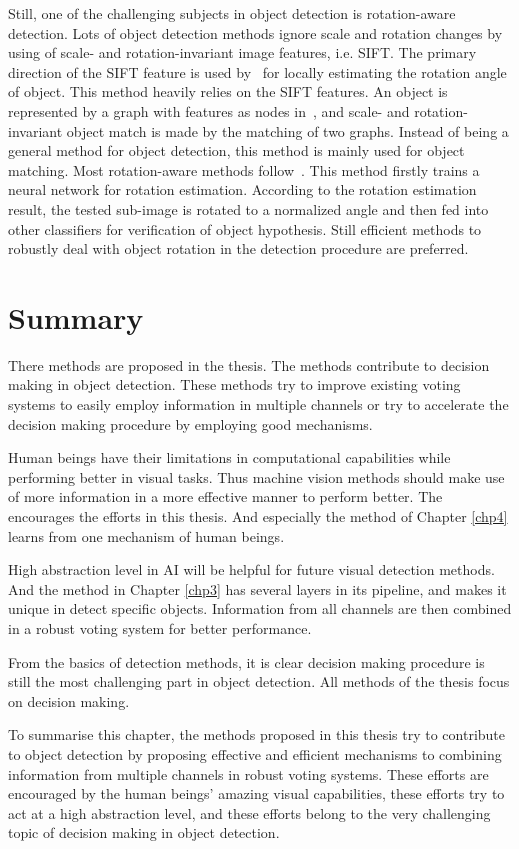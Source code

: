 Still, one of the challenging subjects in object detection is rotation-aware detection. Lots of object detection methods ignore scale and rotation changes by using of scale- and rotation-invariant image features, i.e. SIFT.
The primary  direction of the SIFT feature is used by~\citep{ac21} for locally estimating the rotation angle of object. This method heavily relies on the SIFT features.
An object is represented by a graph with features as nodes in~\citep{ac222}, and scale- and rotation-invariant object match is made by the matching of two graphs. Instead of being a general method for object detection, this method is mainly used for object matching.
Most rotation-aware methods follow~\citep{ac20}. This method firstly trains a neural network for rotation estimation. According to the rotation estimation result, the tested sub-image is rotated to a normalized angle and then fed into other classifiers for verification of object hypothesis. Still efficient methods to robustly deal with object rotation in the detection procedure are preferred.




\begin{comment}
(a) a well-de?ned closed boundary
in space; (b) a different appearance from their surroundings [23, 25]; (c) sometimes it is unique within the image
and stands out as salient
\end{comment}
\section{Summary}
\label{ch2p5}
There methods are proposed in the thesis. The methods contribute to decision making in object detection. These methods try to improve existing voting systems to easily employ information in multiple channels or try to accelerate the decision making procedure by employing good mechanisms. 

Human beings have their limitations in computational capabilities while performing better in visual tasks. Thus machine vision methods should make use of more information in a more effective manner to perform better. The encourages the efforts in this thesis. And especially the method of Chapter \ref{chp4} learns from one mechanism of human beings.

High abstraction level in AI will be helpful for future visual detection methods. And the method in Chapter \ref{chp3} has several layers in its pipeline, and makes it unique in detect specific objects. Information from all channels are then combined in a robust voting system for better performance. 

From the basics of detection methods, it is clear decision making procedure is still the most challenging part in object detection. All methods of the thesis focus on decision making. 

To summarise this chapter, the methods proposed in this thesis try to contribute to object detection by proposing effective and efficient mechanisms to combining information from multiple channels in robust voting systems. These efforts are encouraged by the human beings' amazing visual capabilities, these efforts try to act at a high abstraction level, and these efforts belong to the very challenging topic of decision making in object detection. 